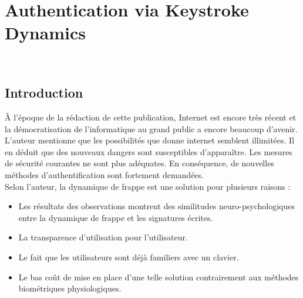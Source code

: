 \section{Authentication via Keystroke Dynamics\cite{monrose1997}}

\\





\subsection{Introduction}

À l'époque de la rédaction de cette publication, Internet est encore très récent et la démocratisation de l'informatique au grand public a encore beaucoup d'avenir. L’auteur mentionne que les possibilités que donne internet semblent illimitées. Il en déduit que des nouveaux dangers sont susceptibles d'apparaître. Les mesures de sécurité courantes ne sont plus adéquates. En conséquence, de nouvelles méthodes d’authentification sont fortement demandées.\\

Selon l’auteur, la dynamique de frappe est une solution pour plusieurs raisons :\\

\begin{itemize}
\item Les résultats des observations montrent des similitudes neuro-psychologiques entre la dynamique de frappe et les signatures écrites.
\item La transparence d'utilisation pour l'utilisateur.
\item Le fait que les utilisateurs sont déjà familiers avec un clavier.
\item Le bas coût de mise en place d’une telle solution contrairement aux méthodes biométriques physiologiques.\\
\end{itemize}


